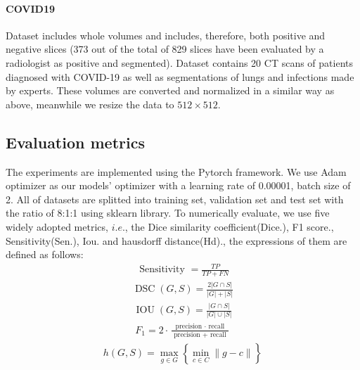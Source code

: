 \documentclass{ieeeaccess}
\begin{document}
\paragraph{COVID19}
Dataset\cite{covid19} includes whole volumes and includes, therefore, both positive and negative slices 
(373 out of the total of 829 slices have been evaluated by a radiologist as positive and segmented). 
Dataset\cite{covid19_2} contains 20 CT scans of patients diagnosed with COVID-19 as well as segmentations of lungs and infections made by experts.
These volumes are converted and normalized in a similar way as above, meanwhile we resize the data to $512\times 512$.

\subsection{Evaluation metrics}
The experiments are implemented using the Pytorch framework. We use Adam optimizer\cite{Adam} as our
models' optimizer with a learning rate of 0.00001, batch size of 2. All of datasets are splitted into training set, validation set and test set with 
the ratio of 8:1:1 using sklearn library. To numerically evaluate, we use five widely adopted metrics, \(i.e.\),
the Dice similarity coefficient(Dice.), F1 score., Sensitivity(Sen.), Iou. and hausdorff distance(Hd)., the expressions of them are defined as follows:
\begin{align}
  \text { Sensitivity }=\frac{T P}{T P+F N}
\end{align}
\begin{align}
  \operatorname{DSC}(G, S)=\frac{2|G \cap S|}{|G|+|S|}
\end{align}
\begin{align}
  \operatorname{IOU}(G, S)=\frac{|G \cap S|}{|G| \cup|S|}
\end{align}
\begin{align}
  F_{1}=2 \cdot \frac{\text { precision } \cdot \text { recall }}{\text { precision }+\text { recall }}
\end{align}
\begin{align}
  h(G, S)=\max _{g \in G}\left\{\min _{c \in C}\|g-c\|\right\}
\end{align}
\end{document}
